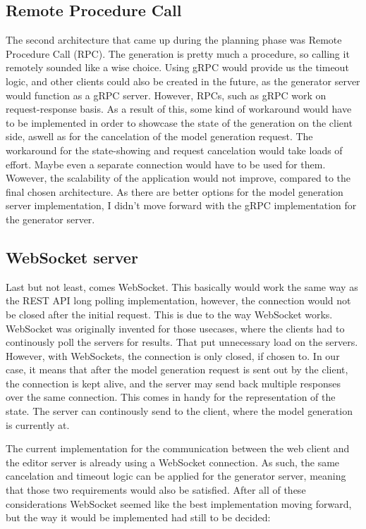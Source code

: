 \subsection{Remote Procedure Call}
The second architecture that came up during the planning phase was Remote Procedure Call (RPC). The generation is pretty much
a procedure, so calling it remotely sounded like a wise choice. Using gRPC would provide us the timeout logic, and other clients
could also be created in the future, as the generator server would function as a gRPC server. 
However, RPCs, such as gRPC work on request-response basis. As a result of this, some kind of workaround would have to be 
implemented in order to showcase the state of the generation on the client side, aswell as for the cancelation of the 
model generation request. The workaround for the state-showing and request cancelation would take
loads of effort. Maybe even a separate connection would have to be used for them. Wowever, the scalability of the
 application would not improve, compared to the final chosen architecture. 
As there are better options for the model generation server implementation, I didn't move forward with
the gRPC implementation for the generator server. 

\subsection{WebSocket server}
Last but not least, comes WebSocket. This basically would work the same way as the REST API long polling implementation,
 however, the connection would not be closed after the initial request. This is due to the way WebSocket works.
 WebSocket was originally invented for those usecases, where the clients
 had to continously poll the servers for results. That put unnecessary load on the servers. However, with WebSockets, the connection 
 is only closed, if chosen to. In our case, it means that after the model generation request is sent out by the client,
  the connection is kept alive, and the server may send back multiple responses over the same connection.
 This comes in handy for the representation of the state. The server can continously send to the client,
  where the model generation is currently at.

  The current implementation for the communication between the web client and the editor server is already using a WebSocket connection.
  As such, the same cancelation and timeout logic can be applied for the generator server, meaning that those two requirements would also be satisfied.
  After all of these considerations WebSocket seemed like the best implementation moving forward, but the way it would be implemented
  had still to be decided:

